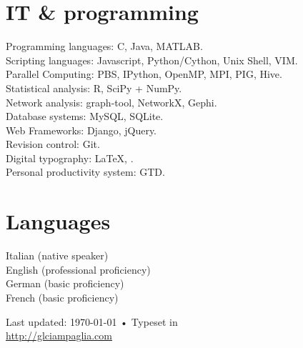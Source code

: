 \documentclass[10pt, letterpaper]{article}
\begin{document}
\section*{IT \& programming}

Programming languages: C, Java, MATLAB.\\
%
Scripting languages: Javascript, Python/Cython, Unix Shell, VIM.\\
%
Parallel Computing: PBS, IPython, OpenMP, MPI, PIG, Hive.\\
%
Statistical analysis: R, SciPy + NumPy.\\
%
Network analysis: graph-tool, NetworkX, Gephi.\\
%
Database systems: MySQL, SQLite.\\
%
Web Frameworks: Django, jQuery.\\
%
Revision control: Git.\\
%
Digital typography: \LaTeX, \XeTeX.\\
%
Personal productivity system: GTD.

\section*{Languages}

Italian (native speaker)\\
%
English (professional proficiency)\\
%
German (basic proficiency)\\
%
French (basic proficiency)

\vfill{}

\begin{center}
{\scriptsize  Last updated: \today\- •\- 
Typeset in { \XeTeX}\\
\href{http://glciampaglia.com}{http://glciampaglia.com}}
\end{center}
\end{document}
